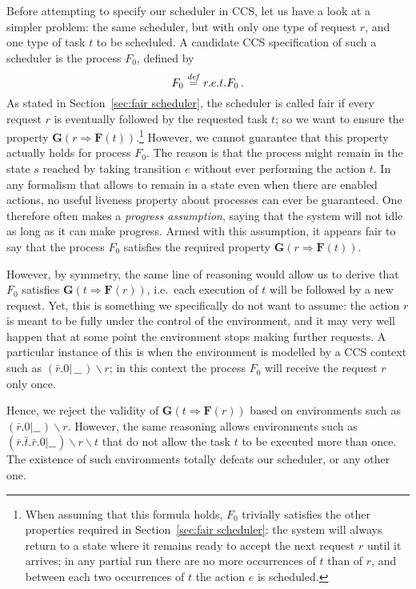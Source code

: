 \documentclass[smallcondensed]{svjour3}
\newcommand{\Sect}[1]{Section~\ref{sec:#1}}
\newcounter {part}
\begin{document}
\newcommand{\D}{\ensuremath{F}}
\newcommand{\Do}{\ensuremath{F_{0}}}
Before attempting to specify our scheduler in CCS, let us have a look at a
simpler problem: the same scheduler, but with only one type of request $r$,
and one type of task $t$ to be scheduled. A candidate CCS
specification of such a scheduler is the process $\Do$, defined by\vspace{-1ex}
\[ \Do \stackrel{{\it def}}{=} r.e.t.\Do\,.\vspace{-2pt}\]
As stated in Section~\ref{sec:fair scheduler}, the scheduler is called fair if 
every request $r$ is eventually followed by the requested task $t$; so we 
want to ensure the property
$\mathbf{G}(r \Rightarrow \mathbf{F}(t))$.\footnote{When assuming that this formula holds,
  $\Do$ trivially satisfies the other properties required in \Sect{fair scheduler}:
the system will always return to a state where it remains ready to
accept the next request $r$ until it arrives; in any partial run there are no more
occurrences of $t$ than of $r$, and between each two occurrences of
$t$ the action $e$ is scheduled.}
However, we cannot guarantee that this property actually holds for process $\Do$.
The reason is that the process might remain in the state $s$ 
reached by taking transition $e$ without ever performing the 
action $t$. In any formalism that allows to remain in a state
even when there are enabled actions, no useful liveness property about
processes can ever be guaranteed. One therefore often makes a \emph{progress assumption},
saying that the system will not idle as long as it can make progress.
Armed with this assumption, it appears fair to say that the process $\Do$ satisfies the required
property $\mathbf{G}(r \Rightarrow \mathbf{F}(t))$.

However, by symmetry, the same line of reasoning would allow us to derive that $\Do$ satisfies
$\mathbf{G}(t \Rightarrow \mathbf{F}(r))$, i.e.\ each execution of $t$ will be followed by a new
request. Yet, this is something we specifically do not want to assume: the action $r$ is meant to be
fully under the control of the environment, and it may very well happen that at some point the
environment stops making further requests. A particular instance of this is when the environment is modelled by
a CCS context such as $(\bar r.0 | \,\_\!\_\,)\backslash r$; in this context the process $\Do$ will
receive the request $r$ only once.

Hence, we reject the validity of $\mathbf{G}(t \Rightarrow \mathbf{F}(r))$ based on environments
such as $(\bar r.0 | \_\!\_\hspace{1pt})\backslash r$.
However, the same reasoning allows environments such as $(\bar r.\bar t.\bar r.0 | \_\!\_\hspace{1pt})\backslash r\backslash t$
that do not allow the task $t$ to be executed more than once. The existence of such environments
totally defeats our scheduler, or any other one.
\end{document}

